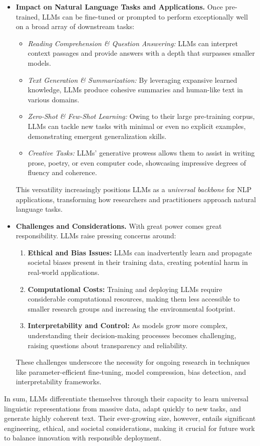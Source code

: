 \begin{itemize}
    \item \textbf{Impact on Natural Language Tasks and Applications.}
    Once pre-trained, LLMs can be fine-tuned or prompted to perform exceptionally well on a broad array of downstream tasks:
    \begin{itemize}
        \item \textit{Reading Comprehension \& Question Answering:} LLMs can interpret context passages and provide answers with a depth that surpasses smaller models.
        \item \textit{Text Generation \& Summarization:} By leveraging expansive learned knowledge, LLMs produce cohesive summaries and human-like text in various domains.
        \item \textit{Zero-Shot \& Few-Shot Learning:} Owing to their large pre-training corpus, LLMs can tackle new tasks with minimal or even no explicit examples, demonstrating emergent generalization skills.
        \item \textit{Creative Tasks:} LLMs’ generative prowess allows them to assist in writing prose, poetry, or even computer code, showcasing impressive degrees of fluency and coherence.
    \end{itemize}
    This versatility increasingly positions LLMs as a \emph{universal backbone} for NLP applications, transforming how researchers and practitioners approach natural language tasks.

    \item \textbf{Challenges and Considerations.}
    With great power comes great responsibility. LLMs raise pressing concerns around:
    \begin{enumerate}
        \item \textbf{Ethical and Bias Issues:} LLMs can inadvertently learn and propagate societal biases present in their training data, creating potential harm in real-world applications.
        \item \textbf{Computational Costs:} Training and deploying LLMs require considerable computational resources, making them less accessible to smaller research groups and increasing the environmental footprint.
        \item \textbf{Interpretability and Control:} As models grow more complex, understanding their decision-making processes becomes challenging, raising questions about transparency and reliability.
    \end{enumerate}
    These challenges underscore the necessity for ongoing research in techniques like parameter-efficient fine-tuning, model compression, bias detection, and interpretability frameworks.

\end{itemize}

\noindent
In sum, LLMs differentiate themselves through their capacity to learn universal linguistic representations from massive data, adapt quickly to new tasks, and generate highly coherent text. Their ever-growing size, however, entails significant engineering, ethical, and societal considerations, making it crucial for future work to balance innovation with responsible deployment. 

